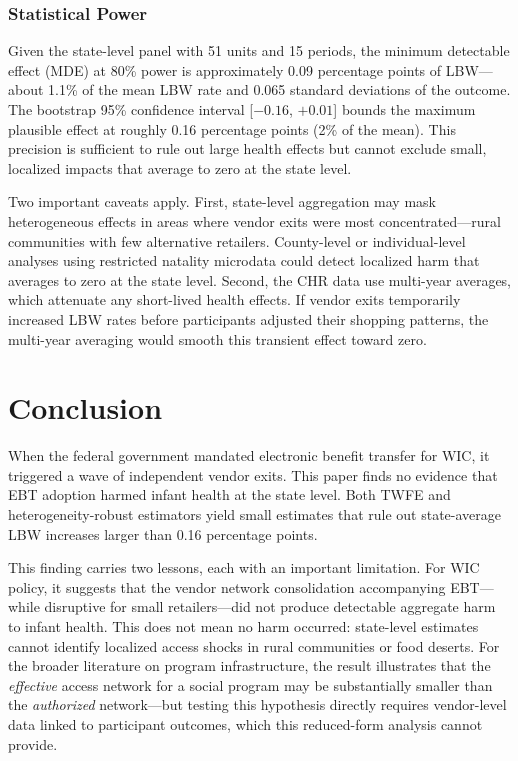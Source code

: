 \documentclass[12pt]{article}
\begin{document}
\subsubsection*{Statistical Power} Given the state-level panel with 51 units and 15 periods, the minimum detectable effect (MDE) at 80\% power is approximately 0.09 percentage points of LBW---about 1.1\% of the mean LBW rate and 0.065 standard deviations of the outcome. The bootstrap 95\% confidence interval [$-0.16$, $+0.01$] bounds the maximum plausible effect at roughly 0.16 percentage points (2\% of the mean). This precision is sufficient to rule out large health effects but cannot exclude small, localized impacts that average to zero at the state level.

Two important caveats apply. First, state-level aggregation may mask heterogeneous effects in areas where vendor exits were most concentrated---rural communities with few alternative retailers. County-level or individual-level analyses using restricted natality microdata could detect localized harm that averages to zero at the state level. Second, the CHR data use multi-year averages, which attenuate any short-lived health effects. If vendor exits temporarily increased LBW rates before participants adjusted their shopping patterns, the multi-year averaging would smooth this transient effect toward zero.

\section{Conclusion}

When the federal government mandated electronic benefit transfer for WIC, it triggered a wave of independent vendor exits. This paper finds no evidence that EBT adoption harmed infant health at the state level. Both TWFE and heterogeneity-robust estimators yield small estimates that rule out state-average LBW increases larger than 0.16 percentage points.

This finding carries two lessons, each with an important limitation. For WIC policy, it suggests that the vendor network consolidation accompanying EBT---while disruptive for small retailers---did not produce detectable aggregate harm to infant health. This does not mean no harm occurred: state-level estimates cannot identify localized access shocks in rural communities or food deserts. For the broader literature on program infrastructure, the result illustrates that the \textit{effective} access network for a social program may be substantially smaller than the \textit{authorized} network---but testing this hypothesis directly requires vendor-level data linked to participant outcomes, which this reduced-form analysis cannot provide.
\end{document}
